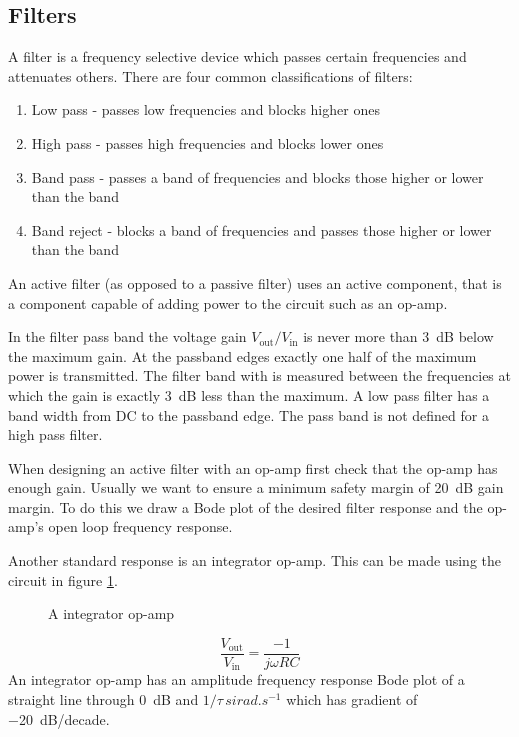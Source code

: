 \documentclass{article}
\begin{document}
    \subsection{Filters}
    A filter is a frequency selective device which passes certain frequencies and attenuates others.
    There are four common classifications of filters:
    \begin{enumerate}
        \item Low pass - passes low frequencies and blocks higher ones
        \item High pass - passes high frequencies and blocks lower ones
        \item Band pass - passes a band of frequencies and blocks those higher or lower than the band
        \item Band reject - blocks a band of frequencies and passes those higher or lower than the band
    \end{enumerate}
    An active filter (as opposed to a passive filter) uses an active component, that is a component capable of adding power to the circuit such as an op-amp.
    
    In the filter pass band the voltage gain \(V_\text{out}/V_\text{in}\) is never more than \SI{3}{dB} below the maximum gain.
    At the passband edges exactly one half of the maximum power is transmitted.
    The filter band with is measured between the frequencies at which the gain is exactly \SI{3}{dB} less than the maximum.
    A low pass filter has a band width from DC to the passband edge.
    The pass band is not defined for a high pass filter.
    
    When designing an active filter with an op-amp first check that the op-amp has enough gain.
    Usually we want to ensure a minimum safety margin of \SI{20}{dB} gain margin.
    To do this we draw a Bode plot of the desired filter response and the op-amp's open loop frequency response.
    
    Another standard response is an integrator op-amp.
    This can be made using the circuit in figure \ref{fig:integrator op-amp}.
    \begin{figure}[ht]
        \centering
        \caption{A integrator op-amp}
        \label{fig:integrator op-amp}
    \end{figure}
    \[\frac{V_\text{out}}{V_\text{in}} = \frac{-1}{j\omega RC}\]
    An integrator op-amp has an amplitude frequency response Bode plot of a straight line through \SI{0}{dB} and \(1/\tau\,si{rad.s^{-1}}\) which has gradient of \SI{-20}{dB}/decade.
    
\end{document}
